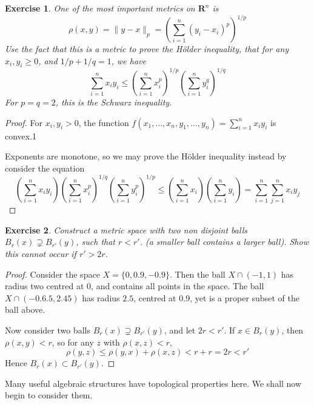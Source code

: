 \documentclass{report}
\theoremstyle{plain}
\newtheorem{exercise}{Exercise}[section]
\theoremstyle{definition}
\begin{document}
\begin{exercise}
    One of the most important metrics on $\mathbf{R}^n$ is
    \[ \rho(x,y) = \|y - x\|_p = \left( \sum_{i = 1}^n (y_i - x_i)^p \right)^{1/p} \]
    Use the fact that this is a metric to prove the {\it H\"{o}lder inequality}, that for any $x_i,y_i \geq 0$, and $1/p + 1/q = 1$, we have
    \[ \sum_{i = 1}^n x_iy_i \leq \left( \sum_{i = 1}^n x_i^p \right)^{1/p} \left( \sum_{i = 1}^n y_i^q \right)^{1/q} \]
    For $p = q = 2$, this is the Schwarz inequality.
\end{exercise}
\begin{proof}
    For $x_i,y_i > 0$, the function $f(x_1, \dots, x_n, y_1, \dots, y_n) = \sum_{i = 1}^n x_iy_i$ is convex.1

    Exponents are monotone, so we may prove the H\"{o}lder inequality instead by consider the equation
    \[ \left(\sum_{i = 1}^n x_iy_i \right) \left( \sum_{i = 1}^n x_i^p \right)^{1/q} \left( \sum_{i = 1}^n y_i^p \right)^{1/p} \leq \left( \sum_{i = 1}^n x_i \right) \left( \sum_{i = 1}^n y_i \right) = \sum_{i = 1}^n \sum_{j = 1}^n x_iy_j \]
\end{proof}

\begin{exercise}
    Construct a metric space with two non disjoint balls $B_r(x) \supsetneq B_{r'}(y)$, such that $r < r'$. (a smaller ball contains a larger ball). Show this cannot occur if $r' > 2r$.
\end{exercise}
\begin{proof}
    Consider the space $X = \{ 0, 0.9, -0.9 \}$. Then the ball $X \cap (-1,1)$ has radius two centred at 0, and contains all points in the space. The ball $X \cap (-0.6.5,2.45)$ has radius $2.5$, centred at $0.9$, yet is a proper subset of the ball above.

    Now consider two balls $B_r(x) \supsetneq B_{r'}(y)$, and let $2r < r'$. If $x \in B_r(y)$, then $\rho(x,y) < r$, so for any $z$ with $\rho(x,z) < r$,
    \[ \rho(y,z) \leq \rho(y,x) + \rho(x,z) < r + r = 2r < r' \]
    Hence $B_r(x) \subset B_{r'}(y)$.
\end{proof}

Many useful algebraic structures have topological properties here. We shall now begin to consider them.
\end{document}

